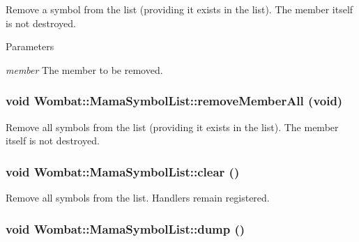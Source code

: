 Remove a symbol from the list (providing it exists in the list). The member itself is not destroyed.


\begin{DoxyParams}{Parameters}
\item[{\em member}]The member to be removed. \end{DoxyParams}
\hypertarget{classWombat_1_1MamaSymbolList_a21809320201362eb6a2786900da81dd7}{
\subsubsection[{removeMemberAll}]{\setlength{\rightskip}{0pt plus 5cm}void Wombat::MamaSymbolList::removeMemberAll (void)}}
\label{classWombat_1_1MamaSymbolList_a21809320201362eb6a2786900da81dd7}


Remove all symbols from the list (providing it exists in the list). The member itself is not destroyed. \hypertarget{classWombat_1_1MamaSymbolList_a63e9d516a096a15ba329744cc2d88ae7}{
\subsubsection[{clear}]{\setlength{\rightskip}{0pt plus 5cm}void Wombat::MamaSymbolList::clear ()}}
\label{classWombat_1_1MamaSymbolList_a63e9d516a096a15ba329744cc2d88ae7}


Remove all symbols from the list. Handlers remain registered. \hypertarget{classWombat_1_1MamaSymbolList_aad43c5e64c5287414c1d02b978f3ed99}{
\subsubsection[{dump}]{\setlength{\rightskip}{0pt plus 5cm}void Wombat::MamaSymbolList::dump ()}}
\label{classWombat_1_1MamaSymbolList_aad43c5e64c5287414c1d02b978f3ed99}


